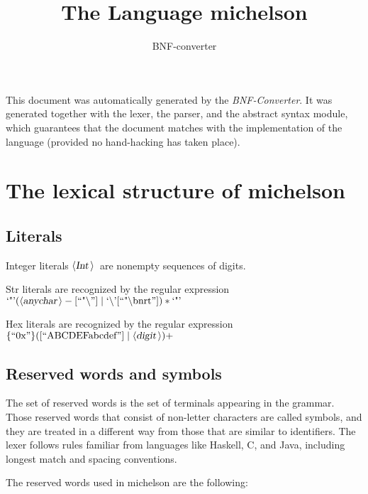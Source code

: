 \documentclass[a4paper,11pt]{article}
\title{The Language michelson}
\author{BNF-converter}
\begin{document}
\maketitle


\newcommand{\emptyP}{\mbox{$\epsilon$}}
\newcommand{\terminal}[1]{\mbox{{\texttt {#1}}}}
\newcommand{\nonterminal}[1]{\mbox{$\langle \mbox{{\sl #1 }} \! \rangle$}}
\newcommand{\arrow}{\mbox{::=}}
\newcommand{\delimit}{\mbox{$|$}}
\newcommand{\reserved}[1]{\mbox{{\texttt {#1}}}}
\newcommand{\literal}[1]{\mbox{{\texttt {#1}}}}
\newcommand{\symb}[1]{\mbox{{\texttt {#1}}}}

This document was automatically generated by the {\em BNF-Converter}.
It was generated together with the lexer, the parser, and the
abstract syntax module, which guarantees that the document
matches with the implementation of the language
(provided no hand-hacking has taken place).

\section*{The lexical structure of michelson}

\subsection*{Literals}
Integer literals \nonterminal{Int}\ are nonempty sequences of digits.



Str literals are recognized by the regular expression
\(\mbox{`"'} ({\nonterminal{anychar}} - [\mbox{``"$\backslash$''}] \mid \mbox{`$\backslash$'} [\mbox{``"$\backslash$bnrt''}])* \mbox{`"'}\)

Hex literals are recognized by the regular expression
\(\{\mbox{``0x''}\} ([\mbox{``ABCDEFabcdef''}] \mid {\nonterminal{digit}})+\)

\subsection*{Reserved words and symbols}
The set of reserved words is the set of terminals appearing in the grammar. Those reserved words that consist of non-letter characters are called symbols, and they are treated in a different way from those that are similar to identifiers. The lexer follows rules familiar from languages like Haskell, C, and Java, including longest match and spacing conventions.

The reserved words used in michelson are the following: \\
\end{document}
